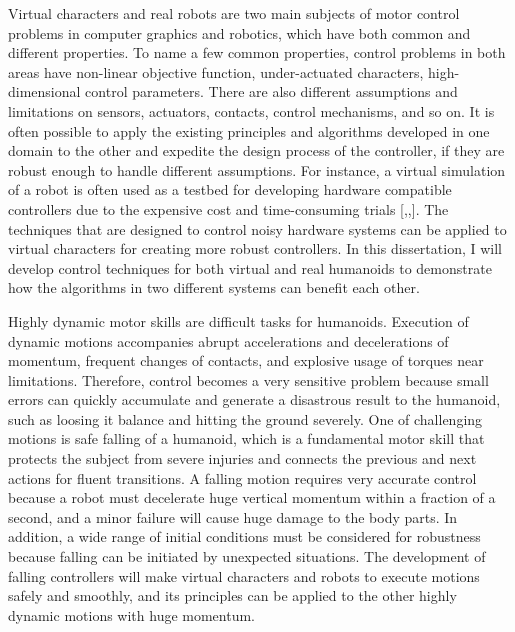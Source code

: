 Virtual characters and real robots are two main subjects of motor control
problems in computer graphics and robotics, which have both common and
different properties.
To name a few common properties, control problems in both areas have 
non-linear objective function, under-actuated characters, high-dimensional
control parameters.
There are also different assumptions and limitations
on sensors, actuators, contacts, control mechanisms, and so on.
It is often possible to apply the existing principles and
algorithms developed in one domain to the other and expedite the
design process of the controller, 
if they are robust enough to handle different assumptions.
For instance, a virtual simulation of a robot is often used as a testbed for
developing hardware compatible controllers due to the expensive cost and
time-consuming trials [,,].
The techniques that are designed to control noisy hardware systems 
can be applied to virtual characters for creating more robust controllers.
In this dissertation, I will develop control techniques for both virtual and
real humanoids to demonstrate how the algorithms in two different systems can
benefit each other.

Highly dynamic motor skills are difficult tasks for humanoids.
Execution of dynamic motions accompanies abrupt accelerations and decelerations
of momentum, frequent changes of contacts, and explosive usage of torques near
limitations.
Therefore, control becomes a very sensitive problem because small errors can
quickly accumulate and generate a disastrous result to the humanoid, such as
loosing it balance and hitting the ground severely.
One of challenging motions is safe falling of a humanoid, which is 
a fundamental motor skill that protects the subject from severe
injuries and connects the previous and next actions for fluent transitions.
A falling motion requires very accurate control because a robot must decelerate
huge vertical momentum within a fraction of a second, and a minor failure
will cause huge damage to the body parts.
In addition, a wide range of initial conditions must be considered 
for robustness because falling can be initiated by unexpected situations.
The development of falling controllers will make virtual 
characters and robots to execute motions safely and smoothly,
and its principles can be applied to the other highly dynamic motions
with huge momentum.

